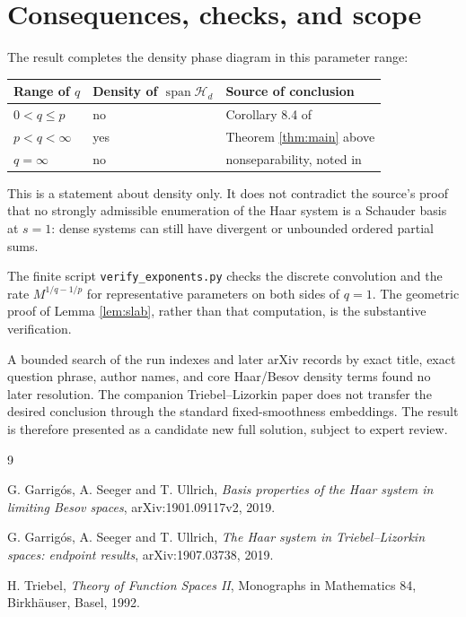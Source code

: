 \documentclass[11pt]{article}
\newcommand{\Haar}{\mathcal H_d}
\newcommand{\Span}{\operatorname{span}}
\newcommand{\1}{\mathbf 1}
\begin{document}
\section{Consequences, checks, and scope}

The result completes the density phase diagram in this parameter range:
\begin{center}
\begin{tabular}{@{}lll@{}}
\toprule
Range of $q$ & Density of $\Span\Haar$ & Source of conclusion\\
\midrule
$0<q\le p$ & no & Corollary 8.4 of \cite{GSU}\\
$p<q<\infty$ & yes & Theorem \ref{thm:main} above\\
$q=\infty$ & no & nonseparability, noted in \cite{GSU}\\
\bottomrule
\end{tabular}
\end{center}

This is a statement about density only.  It does not contradict the source's
proof that no strongly admissible enumeration of the Haar system is a
Schauder basis at $s=1$: dense systems can still have divergent or unbounded
ordered partial sums.

The finite script \texttt{verify\_exponents.py} checks the discrete
convolution and the rate $M^{1/q-1/p}$ for representative parameters on
both sides of $q=1$.  The geometric proof of Lemma \ref{lem:slab}, rather
than that computation, is the substantive verification.

A bounded search of the run indexes and later arXiv records by exact title,
exact question phrase, author names, and core Haar/Besov density terms found
no later resolution.  The companion Triebel--Lizorkin paper
\cite{GSUendpoint} does not transfer the desired conclusion through the
standard fixed-smoothness embeddings.  The result is therefore presented as
a candidate new full solution, subject to expert review.

\begin{thebibliography}{9}

G. Garrig\'os, A. Seeger and T. Ullrich,
\emph{Basis properties of the Haar system in limiting Besov spaces},
arXiv:1901.09117v2, 2019.

G. Garrig\'os, A. Seeger and T. Ullrich,
\emph{The Haar system in Triebel--Lizorkin spaces: endpoint results},
arXiv:1907.03738, 2019.

H. Triebel,
\emph{Theory of Function Spaces II}, Monographs in Mathematics 84,
Birkh\"auser, Basel, 1992.

\end{thebibliography}
\end{document}
